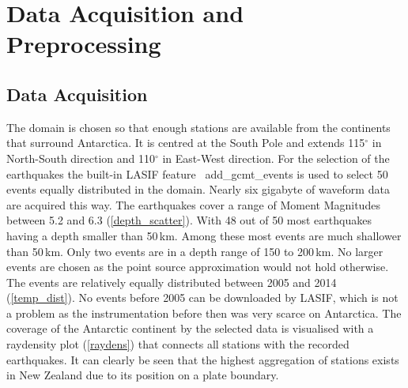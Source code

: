 
\chapter{Data Acquisition and Preprocessing}

\section{Data Acquisition}

The domain is chosen so that enough stations are available from the continents that surround Antarctica.
It is centred at the South Pole and extends 115$^\circ$ in North-South direction and 110$^\circ$ in
East-West direction. 
For the selection of the earthquakes the built-in LASIF feature \
add\_gcmt\_events is used to select 50 events equally distributed in the
domain. %
Nearly six gigabyte of waveform data are acquired this way.
The earthquakes cover a range of Moment Magnitudes between 5.2 and 6.3 (\autoref{depth_scatter}). 
With 48 out of 50 most earthquakes having a depth smaller than 50\,km. Among these most 
events are much shallower than 50\,km. Only two events are in a depth range of 150 to 200\,km. 
No larger events are chosen as the point source approximation would not hold otherwise. 
The events are relatively equally distributed between 2005 and 2014 (\autoref{temp_dist}). No events before 2005 can 
be downloaded by LASIF, which is not a problem as the instrumentation before then was very scarce on Antarctica. 
The coverage of the Antarctic continent by the selected data is visualised with a raydensity plot (\autoref{raydens}) 
that connects all stations with the recorded earthquakes. It can clearly be seen that the highest aggregation of stations 
exists in New Zealand due to its position on a plate boundary. \\



